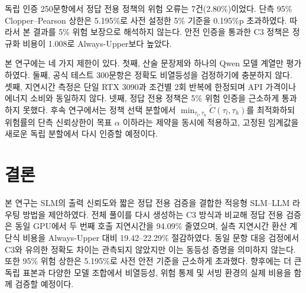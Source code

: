 \documentclass[preprint]{kcc}
\begin{document}
\begin{table}[t]
\centering
\caption{정답 전용 검증과 C3의 대응 비교(단위: \%p)}
\label{tab:paired}
\small
\setlength{\tabcolsep}{2.5pt}
\end{table}

독립 인증 250문항에서 정답 전용 정책의 위험 오류는 7건(2.80\%)이었다.
단측 95\% Clopper--Pearson 상한은 5.195\%로 사전 설정한 5\% 기준을 0.195\%p
초과하였다. 따라서 본 결과를 5\% 위험 보장으로 해석하지 않는다. 안전 인증을 통과한
C3 정책은 정규화 비용이 1.008로 Always-Upper보다 높았다.

본 연구에는 네 가지 제한이 있다. 첫째, 산술 문장제와 하나의 Qwen 모델 계열만
평가하였다. 둘째, 공식 테스트 300문항은 정확도 비열등성을 검정하기에 충분하지 않다.
셋째, 지연시간 측정은 단일 RTX 3090과 조건별 2회 반복에 한정되며 API 가격이나 에너지
소비와 동일하지 않다. 넷째, 정답 전용 정책은 5\% 위험 인증을 근소하게 통과하지
못했다. 후속 연구에서는 정책 선택 분할에서
$\min_{\tau_l,\tau_h}\widetilde{C}(\tau_l,\tau_h)$를 최적화하되 위험률의 단측
신뢰상한이 목표 $\alpha$ 이하라는 제약을 동시에 적용하고, 고정된 임계값을 새로운 독립
분할에서 다시 인증할 예정이다.

\section{결론}

본 연구는 SLM의 출력 신뢰도와 짧은 정답 전용 검증을 결합한 적응형 SLM--LLM
라우팅 방법을 제안하였다. 전체 풀이를 다시 생성하는 C3 방식과 비교해 정답 전용
검증은 동일 GPU에서 두 번째 호출 지연시간을 94.09\% 줄였으며, 실측 지연시간 환산
계단식 비용을 Always-Upper 대비 19.42--22.29\% 절감하였다. 동일 문항 대응
검정에서 C3와 유의한 정확도 차이는 관측되지 않았지만 이는 동등성 증명을 의미하지
않는다. 또한 95\% 위험 상한은 5.195\%로 사전 안전 기준을 근소하게 초과했다.
향후에는 더 큰 독립 표본과 다양한 모델 조합에서 비열등성, 위험 통제 및 서빙
환경의 실제 비용을 함께 검증할 예정이다.
\end{document}
